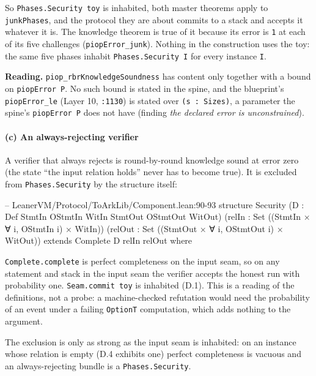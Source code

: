 So \texttt{Phases.\allowbreak{}Security toy} is inhabited, both master theorems apply to \texttt{junkPhases}, and the protocol they are about commits to a stack and accepts it whatever it is. The knowledge theorem is true of it because its error is \texttt{1} at each of its five challenges (\texttt{piopError\_\allowbreak{}junk}). Nothing in the construction uses the toy: the same five phases inhabit \texttt{Phases.\allowbreak{}Security I} for every instance \texttt{I}.

\textbf{Reading.} \texttt{piop\_\allowbreak{}rbrKnowledgeSoundness} has content only together with a bound on \texttt{piopError P}. No such bound is stated in the spine, and the blueprint's \texttt{piopError\_\allowbreak{}le} (Layer 10, \texttt{:1130}) is stated over \texttt{(\allowbreak{}s : Sizes)}, a parameter the spine's \texttt{piopError P} does not have (finding \emph{the declared error is unconstrained}).

\paragraph{(c) An always-rejecting verifier}

A verifier that always rejects is round-by-round knowledge sound at error zero (the state \enquote{the input relation holds} never has to become true). It is excluded from \texttt{Phases.\allowbreak{}Security} by the structure itself:

\begin{leancode}
-- LeanerVM/Protocol/ToArkLib/Component.lean:90-93
structure Security (D : Def StmtIn OStmtIn WitIn StmtOut OStmtOut WitOut)
    (relIn : Set ((StmtIn × ∀ i, OStmtIn i) × WitIn))
    (relOut : Set ((StmtOut × ∀ i, OStmtOut i) × WitOut))
    extends Complete D relIn relOut where
\end{leancode}

\texttt{Complete.\allowbreak{}complete} is perfect completeness on the input seam, so on any statement and stack in the input seam the verifier accepts the honest run with probability one. \texttt{Seam.\allowbreak{}commit toy} is inhabited (D.1). This is a reading of the definitions, not a probe: a machine-checked refutation would need the probability of an event under a failing \texttt{OptionT} computation, which adds nothing to the argument.

The exclusion is only as strong as the input seam is inhabited: on an instance whose relation is empty (D.4 exhibits one) perfect completeness is vacuous and an always-rejecting bundle is a \texttt{Phases.\allowbreak{}Security}.

